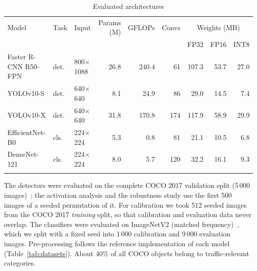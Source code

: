 \documentclass[pdflatex,sn-mathphys-num]{sn-jnl}%
\theoremstyle{thmstyleone}%
\theoremstyle{thmstyletwo}%
\theoremstyle{thmstylethree}%
\begin{document}
\begin{table}[htbp]
\footnotesize\setlength{\tabcolsep}{4pt}
\caption{Evaluated architectures}\label{tab:models}
\begin{tabular}{@{}lllrrrrrr@{}}
\toprule
Model & Task & Input & Params (M) & GFLOPs & Convs & \multicolumn{3}{c}{Weights (MB)} \\
\cmidrule{7-9}
 & & & & & & FP32 & FP16 & INT8 \\
\midrule
Faster R-CNN R50-FPN & det. & 800$\times$1088 & 26.8 & 240.4 & 61 & 107.3 & 53.7 & 27.0 \\
YOLOv10-S & det. & 640$\times$640 & 8.1 & 24.9 & 86 & 29.0 & 14.5 & 7.4 \\
YOLOv10-X & det. & 640$\times$640 & 31.8 & 170.8 & 174 & 117.9 & 58.9 & 29.9 \\
EfficientNet-B0 & cls. & 224$\times$224 & 5.3 & 0.8 & 81 & 21.1 & 10.5 & 6.8 \\
DenseNet-121 & cls. & 224$\times$224 & 8.0 & 5.7 & 120 & 32.2 & 16.1 & 9.3 \\
\botrule
\end{tabular}
\end{table}

The detectors were evaluated on the complete COCO 2017 validation split (5\,000 images)~\cite{lin2014microsoft}; the activation analysis and the robustness study use the first 500 images of a seeded permutation of it. For calibration we took 512 seeded images from the COCO 2017 \emph{training} split, so that calibration and evaluation data never overlap. The classifiers were evaluated on ImageNetV2 (matched frequency)~\cite{recht2019imagenet}, which we split with a fixed seed into 1\,000 calibration and 9\,000 evaluation images. Pre-processing follows the reference implementation of each model (Table~\ref{tab:datasets}). About 40\% of all COCO objects belong to traffic-relevant categories.
\end{document}
